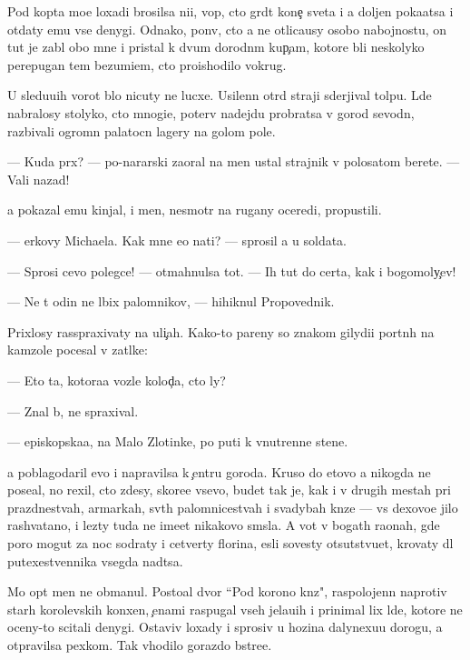 \documentclass[10pt]{book}
\begin{document}
Pod kop{\yi}ta mo{\y}e{\y} loxadi brosilsa ni{\x}i{\y}, vop{\ia}, cto gr{\ia}d{\e}t kone{\c} sveta i {\y}a doljen poka{\y}atsa i otdaty {\y}emu vse denygi. Odnako, pon{\ia}v, cto {\y}a ne otlica{\y}usy osobo{\y} nabojnost{\y}u, on tut je zab{\yi}l obo mne i pristal k dvum dorodn{\yi}m kup{\c}am, kotor{\yi}{\y}e b{\yi}li neskolyko perepugan{\yi} tem bezumi{\y}em, cto proishodilo vokrug.

U sledu{\y}u{\x}ih vorot b{\yi}lo nicuty ne lucxe. Usilenn{\yi}{\y} otr{\ia}d straji sderjival tolpu. L{\iu}de{\y} nabralosy stolyko, cto mnogi{\y}e, poter{\ia}v nadejdu probratsa v gorod sevodn{\ia}, razbivali ogromn{\yi}{\y} palatocn{\yi}{\y} lagery na golom pole.

— Kuda pr{\e}x? — po-nararski zaoral na men{\ia} ustal{\yi}{\y} strajnik v polosatom berete. — Vali nazad!

{\Y}a pokazal {\y}emu kinjal, i men{\ia}, nesmotr{\ia} na rugany oceredi, propustili.

— {\C}erkovy Michaela. Kak mne {\y}e{\y}o na{\y}ti? — sprosil {\y}a u soldata.

— Sprosi cevo polegce! — otmahnulsa tot. — Ih tut do certa, kak i bogomoly{\c}ev!

— Ne t{\yi} odin ne l{\iu}bix palomnikov, — hihiknul Propovednik.

Prixlosy rasspraxivaty na uli{\c}ah. Kako{\y}-to pareny so znakom gilydi{\y}i portn{\yi}h na kamzole pocesal v zat{\yi}lke:

— Eto ta, kotora{\y}a vozle kolod{\c}a, cto ly?

— Znal b{\yi}, ne spraxival.

— {\Y}episkopska{\y}a, na Malo{\y} Zlotinke, po puti k vnutrenne{\y} stene.

{\Y}a poblagodaril {\y}evo i napravilsa k {\c}entru goroda. Kruso do etovo {\y}a nikogda ne pose{\x}al, no rexil, cto zdesy, skore{\y}e vsevo, budet tak je, kak i v drugih mestah pri prazdnestvah, {\y}armarkah, sv{\ia}t{\yi}h palomnicestvah i svadybah kn{\ia}ze{\y} — vs{\e} dexovo{\y}e jil{\y}o rashvatano, i lezty tuda ne ime{\y}et nikakovo sm{\yi}sla. A vot v bogat{\yi}h ra{\y}onah, gde poro{\y} mogut za noc sodraty i cetverty florina, {\y}esli sovesty otsutstvu{\y}et, krovaty dl{\ia} putexestvennika vsegda na{\y}d{\e}tsa.

Mo{\y} op{\yi}t men{\ia} ne obmanul. Posto{\y}al{\yi}{\y} dvor ``Pod korono{\y} kn{\ia}z{\ia}", raspolojenn{\yi}{\y} naprotiv star{\yi}h korolevskih kon{\iu}xen, {\c}enami raspugal vseh jela{\y}u{\x}ih i prinimal lix l{\iu}de{\y}, kotor{\yi}{\y}e ne oceny-to scitali denygi. Ostaviv loxady i sprosiv u hoz{\ia}{\y}ina dalyne{\y}xu{\y}u dorogu, {\y}a otpravilsa pexkom. Tak v{\yi}hodilo gorazdo b{\yi}stre{\y}e.
\end{document}
